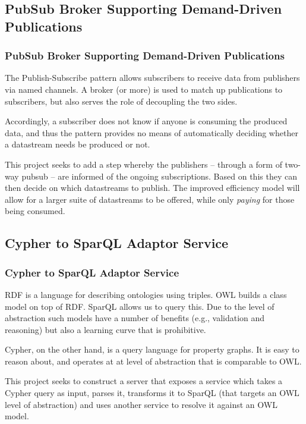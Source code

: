 \subsection{PubSub Broker Supporting Demand-Driven Publications}
\begin{frame}
    \frametitle{PubSub Broker Supporting Demand-Driven Publications}
    \vspace{3mm}
    The Publish-Subscribe pattern allows subscribers to receive data from publishers via named channels. A broker (or more) is used to match up publications to subscribers, but also serves the role of decoupling the two sides.
    
    \vspace{5mm}
    Accordingly, a subscriber does not know if anyone is consuming the produced data, and thus the pattern provides no means of automatically deciding whether a datastream needs be produced or not.
    
    \vspace{5mm}
    This project seeks to add a step whereby the publishers -- through a form of two-way pubsub -- are informed of the ongoing subscriptions. Based on this they can then decide on which datastreams to publish. The improved efficiency model will allow for a larger suite of datastreams to be offered, while only \textsl{paying} for those being consumed.

\end{frame}

\subsection{Cypher to SparQL Adaptor Service}
\begin{frame}
    \frametitle{Cypher to SparQL Adaptor Service}
    \vspace{3mm}
    RDF is a language for describing ontologies using triples. OWL builds a class model on top of RDF. SparQL allows us to query this. Due to the level of abstraction such models have a number of benefits (e.g., validation and reasoning) but also a learning curve that is prohibitive.
    
    \vspace{5mm}
    Cypher, on the other hand, is a query language for property graphs. It is easy to reason about, and operates at at level of abstraction that is comparable to OWL.
    
    \vspace{5mm}
    This project seeks to construct a server that exposes a service which takes a Cypher query as input, parses it, transforms it to SparQL (that targets an OWL level of abstraction) and uses another service to resolve it against an OWL model.
\end{frame}

